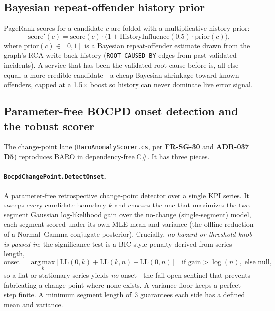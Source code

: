 \documentclass[11pt]{article}
\begin{document}
\subsection{Bayesian repeat-offender history prior}
\label{sec:history}

PageRank scores for a candidate $c$ are folded with a multiplicative history
prior:
\begin{equation}
\text{score}'(c) = \text{score}(c) \cdot
\bigl(1 + \text{HistoryInfluence}(0.5) \cdot \text{prior}(c)\bigr),
\end{equation}
where $\text{prior}(c) \in [0,1]$ is a Bayesian repeat-offender estimate drawn
from the graph's RCA write-back history (\texttt{ROOT\_CAUSED\_BY} edges from past
validated incidents). A service that has been the validated root cause before is,
all else equal, a more credible candidate---a cheap Bayesian shrinkage toward
known offenders, capped at a 1.5$\times$ boost so history can never dominate live
error signal.

\subsection{Parameter-free BOCPD onset detection and the robust scorer}
\label{sec:bocpd}

The change-point lane (\texttt{BaroAnomalyScorer.cs}, per \textbf{FR-SG-30} and
\textbf{ADR-037 D5}) reproduces BARO in dependency-free C\#. It has three pieces.

\paragraph{\texttt{BocpdChangePoint.DetectOnset}.}
A parameter-free retrospective change-point detector over a single KPI series. It
sweeps every candidate boundary $k$ and chooses the one that maximizes the
two-segment Gaussian log-likelihood gain over the no-change (single-segment)
model, each segment scored under its own MLE mean and variance (the offline
reduction of a Normal--Gamma conjugate posterior). Crucially, \emph{no hazard or
threshold knob is passed in}: the significance test is a BIC-style penalty derived
from series length,
\begin{equation}
\text{onset} = \operatorname*{arg\,max}_{k}
\bigl[\, \mathrm{LL}(0,k) + \mathrm{LL}(k,n) - \mathrm{LL}(0,n) \,\bigr]
\quad \text{if gain} > \log(n), \;\text{else null},
\end{equation}
so a flat or stationary series yields \emph{no} onset---the fail-open sentinel
that prevents fabricating a change-point where none exists. A variance floor keeps
a perfect step finite. A minimum segment length of~3 guarantees each side has a
defined mean and variance.
\end{document}
